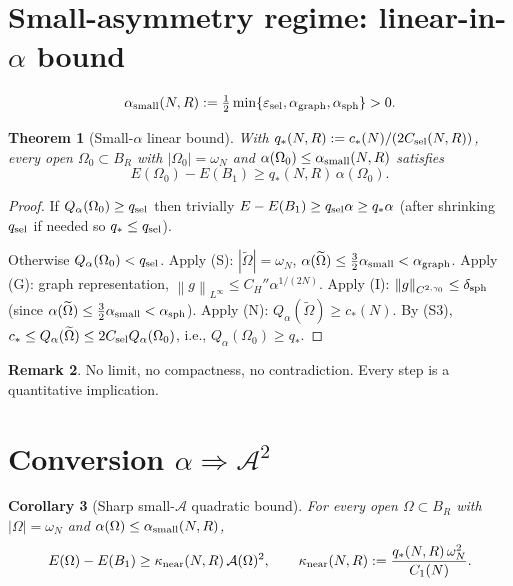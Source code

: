 \documentclass[11pt]{article}
\newtheorem{theorem}{Theorem}[section]
\newtheorem{corollary}[theorem]{Corollary}
\theoremstyle{definition}
\newtheorem{remark}[theorem]{Remark}
\newcommand{\norm}[1]{\left\|#1\right\|}
\newcommand{\Fr}{\mathcal{A}}
\newcommand{\eps}{\varepsilon}
\begin{document}
\section{Small-asymmetry regime: linear-in-$\alpha$ bound}\label{sec:small}

\begin{equation}\label{eq:alpha-small-def}
   \alpha_{\rm small}(N,R)
   :=\tfrac12\min\{\eps_{\rm sel},\alpha_{\rm graph},\alpha_{\rm sph}\}>0.
\end{equation}

\begin{theorem}[Small-$\alpha$ linear bound]\label{thm:small-alpha}
With $q_{*}(N,R):=c_{*}(N)/(2C_{\rm sel}(N,R))$, every open
$\Omega_{0}\subset B_{R}$ with $|\Omega_{0}|=\omega_{N}$ and
$\alpha(\Omega_{0})\le\alpha_{\rm small}(N,R)$ satisfies
\begin{equation}\label{eq:linear-alpha}
   E(\Omega_{0})-E(B_{1})\ge q_{*}(N,R)\,\alpha(\Omega_{0}).
\end{equation}
\end{theorem}

\begin{proof}
If $Q_{\alpha}(\Omega_{0})\ge q_{\rm sel}$ then trivially
$E-E(B_{1})\ge q_{\rm sel}\alpha\ge q_{*}\alpha$ (after shrinking
$q_{\rm sel}$ if needed so $q_{*}\le q_{\rm sel}$).

Otherwise $Q_{\alpha}(\Omega_{0})<q_{\rm sel}$. Apply (S):
$|\widetilde\Omega|=\omega_{N}$, $\alpha(\widetilde\Omega)\le\tfrac32\alpha_{\rm small}<\alpha_{\rm graph}$.
Apply (G): graph representation, $\norm{g}_{L^{\infty}}\le C_{H}''\alpha^{1/(2N)}$.
Apply (I): $\norm{g}_{C^{2,\gamma_{0}}}\le\delta_{\rm sph}$ (since
$\alpha(\widetilde\Omega)\le\tfrac32\alpha_{\rm small}<\alpha_{\rm sph}$).
Apply (N): $Q_{\alpha}(\widetilde\Omega)\ge c_{*}(N)$.
By (S3), $c_{*}\le Q_{\alpha}(\widetilde\Omega)\le 2C_{\rm sel}Q_{\alpha}(\Omega_{0})$,
i.e., $Q_{\alpha}(\Omega_{0})\ge q_{*}$.
\end{proof}

\begin{remark}
No limit, no compactness, no contradiction. Every step is a quantitative
implication.
\end{remark}

\section{Conversion $\alpha\Rightarrow\Fr^{2}$}\label{sec:convert}

\begin{corollary}[Sharp small-$\Fr$ quadratic bound]\label{cor:smallFr}
For every open $\Omega\subset B_{R}$ with $|\Omega|=\omega_{N}$ and
$\alpha(\Omega)\le\alpha_{\rm small}(N,R)$,
\begin{equation}\label{eq:small-fr}
   E(\Omega)-E(B_{1})\ge\kappa_{\rm near}(N,R)\,\Fr(\Omega)^{2},
   \qquad
   \kappa_{\rm near}(N,R):=\frac{q_{*}(N,R)\,\omega_{N}^{2}}{C_{1}(N)}.
\end{equation}
\end{corollary}
\end{document}
